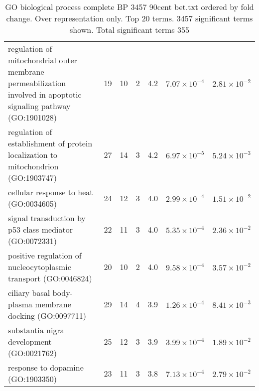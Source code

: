 \begin{table}[ht]
\begin{adjustbox}{width=\textwidth}
\begin{tabular}{lrrrrrr}
  regulation of mitochondrial outer membrane permeabilization involved in apoptotic signaling pathway (GO:1901028) & 19 & 10 & 2 & 4.2 & $7.07 \times 10^{-4}$ & $2.81 \times 10^{-2}$ \\ 
  regulation of establishment of protein localization to mitochondrion (GO:1903747) & 27 & 14 & 3 & 4.2 & $6.97 \times 10^{-5}$ & $5.24 \times 10^{-3}$ \\ 
  cellular response to heat (GO:0034605) & 24 & 12 & 3 & 4.0 & $2.99 \times 10^{-4}$ & $1.51 \times 10^{-2}$ \\ 
  signal transduction by p53 class mediator (GO:0072331) & 22 & 11 & 3 & 4.0 & $5.35 \times 10^{-4}$ & $2.36 \times 10^{-2}$ \\ 
  positive regulation of nucleocytoplasmic transport (GO:0046824) & 20 & 10 & 2 & 4.0 & $9.58 \times 10^{-4}$ & $3.57 \times 10^{-2}$ \\ 
  ciliary basal body-plasma membrane docking (GO:0097711) & 29 & 14 & 4 & 3.9 & $1.26 \times 10^{-4}$ & $8.41 \times 10^{-3}$ \\ 
  substantia nigra development (GO:0021762) & 25 & 12 & 3 & 3.9 & $3.99 \times 10^{-4}$ & $1.89 \times 10^{-2}$ \\ 
  response to dopamine (GO:1903350) & 23 & 11 & 3 & 3.8 & $7.13 \times 10^{-4}$ & $2.79 \times 10^{-2}$ \\ 
   \hline
\end{tabular}
\end{adjustbox}
\caption{GO biological process complete BP 3457 90cent bet.txt ordered by fold change. Over representation only. Top 20 terms. 3457 significant terms shown. Total significant terms 355} 
\label{tab:GO biological process complete BP 3457 90cent bet.txt ordered by fold change. Over representation only. Top 20 terms. 3457 significant terms shown. Total significant terms 355}
\end{table}



